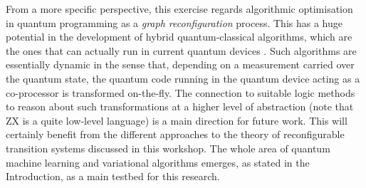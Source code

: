 From a more specific perspective, this exercise regards algorithmic optimisation  in quantum programming  as a \emph{graph reconfiguration} process. This has a huge potential in the development of hybrid quantum-classical algorithms, which are the ones that can actually run in current quantum devices \cite{Preskill2018}. Such algorithms are essentially dynamic in the sense that, depending on a measurement carried over the quantum state, the quantum code running in the quantum device acting as a co-processor is transformed on-the-fly. The connection to suitable logic methods to reason about such transformations at a higher level of abstraction (note that ZX is a quite low-level language) is a main direction for future work. This will certainly benefit from the different approaches to the theory of reconfigurable transition systems discussed in this workshop. The whole area of quantum machine learning and variational algorithms  \cite{Dun16,Cer21} emerges, as stated in the Introduction, as a main testbed for this research.

%
%
%




